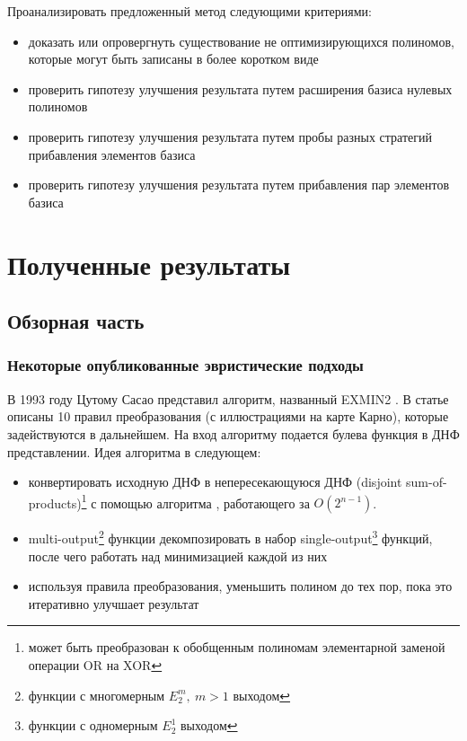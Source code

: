 \documentclass[a4paper,12pt,titlepage,finall]{article}
\begin{document}
Проанализировать предложенный метод следующими критериями:
\begin{itemize}
    \item доказать или опровергнуть существование не оптимизирующихся полиномов, которые могут быть записаны в более коротком виде
    \item проверить гипотезу улучшения результата путем расширения базиса нулевых полиномов
    \item проверить гипотезу улучшения результата путем пробы разных стратегий прибавления элементов базиса
    \item проверить гипотезу улучшения результата путем прибавления пар элементов базиса
\end{itemize}

\newpage

\section{Полученные результаты}

\subsection{Обзорная часть}

\subsubsection{Некоторые опубликованные эвристические подходы}

В 1993 году Цутому Сасао представил алгоритм, названный \textsc{EXMIN2} \cite{exmin2}.
В статье описаны 10 правил преобразования (с иллюстрациями на карте Карно), которые задействуются в дальнейшем. На вход алгоритму подается булева функция в ДНФ представлении. Идея алгоритма в следующем:
\begin{itemize}
    \item конвертировать исходную ДНФ в непересекающуюся ДНФ (disjoint sum-of-products)\footnote{может быть преобразован к обобщенным полиномам элементарной заменой операции \textsc{OR} на \textsc{XOR}} с помощью алгоритма \cite{sop2dsop}, работающего за $ O \left( 2^{n - 1} \right) $.
    \item multi-output\footnote{функции с многомерным $ E_2^m,\ m > 1 $ выходом} функции декомпозировать в набор single-output\footnote{функции с одномерным $ E_2^1 $ выходом} функций, после чего работать над минимизацией каждой из них
    \item используя правила преобразования, уменьшить полином до тех пор, пока это итеративно улучшает результат
\end{itemize}
\end{document}
